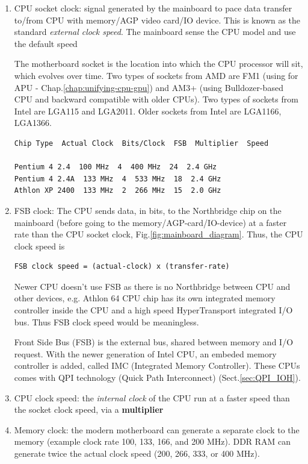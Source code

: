 \begin{enumerate}
  \item CPU socket clock: signal generated by the mainboard to pace data
  transfer to/from CPU with memory/AGP video card/IO device. This is known as
  the standard {\it external clock speed}. The mainboard sense the CPU model
  and use the default speed
  
  The motherboard socket is the location into which the CPU processor will sit,
  which evolves over time. Two types of sockets from AMD are FM1 (using for APU
  - Chap.\ref{chap:unifying-cpu-gpu}) and AM3+ (using Bulldozer-based CPU
  and backward compatible with older CPUs). Two types of sockets from Intel are
  LGA115 and LGA2011. Older sockets from Intel are LGA1166, LGA1366.

\begin{verbatim}
Chip Type  Actual Clock  Bits/Clock  FSB  Multiplier  Speed

Pentium 4 2.4  100 MHz  4  400 MHz  24  2.4 GHz
Pentium 4 2.4A  133 MHz  4  533 MHz  18  2.4 GHz
Athlon XP 2400  133 MHz  2  266 MHz  15  2.0 GHz
\end{verbatim}  

  
  \item FSB clock: The CPU sends data, in bits, to the Northbridge chip on the
  mainboard (before going to the memory/AGP-card/IO-device) at a faster rate
  than the CPU socket clock, Fig.\ref{fig:mainboard_diagram}. 
  Thus, the CPU clock speed is
\begin{verbatim}
FSB clock speed = (actual-clock) x (transfer-rate)
\end{verbatim}
Newer CPU doesn't use FSB as there is no Northbridge between CPU and other
devices, e.g.
Athlon 64 CPU chip has its own integrated memory controller inside the CPU and a
high speed HyperTransport integrated I/O bus. 
Thus FSB clock speed would be meaningless.

\begin{mdframed}
Front Side Bus (FSB) is the external bus, shared between memory and I/O request.
With the newer generation of Intel CPU, an embeded memory controller is added,
called IMC (Integrated Memory Controller). These CPUs comes with QPI technology
(Quick Path Interconnect) (Sect.\ref{sec:QPI_IOH}). 
\end{mdframed}
  
  \item CPU clock speed: the {\it internal clock} of the CPU run at a faster
  speed than the socket clock speed, via a {\bf multiplier}
  
  \item Memory clock: the modern motherboard can generate a separate clock to
  the memory (example clock rate 100, 133, 166, and 200 MHz). DDR RAM can
  generate twice the actual clock speed (200, 266, 333, or 400 MHz).
\end{enumerate}
